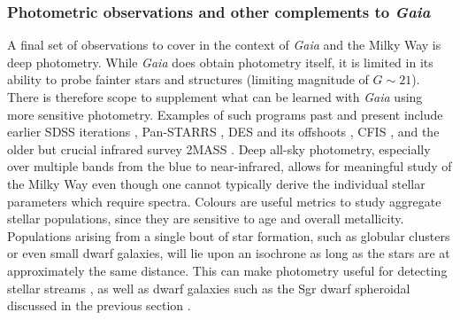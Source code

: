 \subsubsection{Photometric observations and other complements to \textit{Gaia}}

A final set of observations to cover in the context of \textit{Gaia} and the Milky Way is deep photometry. While \textit{Gaia} does obtain photometry itself, it is limited in its ability to probe fainter stars and structures (limiting magnitude of $G \sim 21$). There is therefore scope to supplement what can be learned with \textit{Gaia} using more sensitive photometry. Examples of such programs past and present include earlier SDSS iterations \parencite[which lead to the already-noted `field of streams';][]{belokurov06}, Pan-STARRS \parencite{panstarrs}, DES and its offshoots \parencite{des}, CFIS \parencite{cfis}, and the older but crucial infrared survey 2MASS \parencite{2mass}. Deep all-sky photometry, especially over multiple bands from the blue to near-infrared, allows for meaningful study of the Milky Way even though one cannot typically derive the individual stellar parameters which require spectra. Colours are useful metrics to study aggregate stellar populations, since they are sensitive to age and overall metallicity. Populations arising from a single bout of star formation, such as globular clusters or even small dwarf galaxies, will lie upon an isochrone as long as the stars are at approximately the same distance. This can make photometry useful for detecting stellar streams \parencite[e.g.][]{odenkirchen03,grillmair06,belokurov06,bernard14}, as well as dwarf galaxies such as the Sgr dwarf spheroidal discussed in the previous section \parencite{ibata94}.

